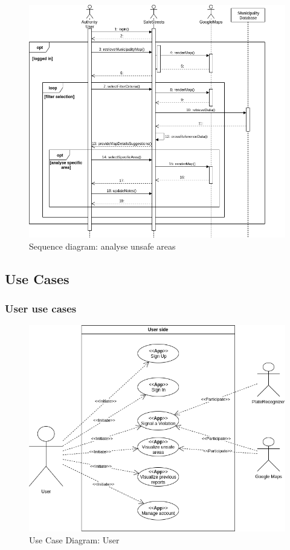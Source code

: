 \documentclass{article}
\begin{document}
\begin{figure}[H]
    \centering
    \includegraphics[scale=0.47]{Images/SequenceThirdPartyUnsafeAreas} 
    \caption{Sequence diagram: analyse unsafe areas}
\end{figure}


\subsection{Use Cases}
\subsubsection{User use cases}
\begin{figure}[H]
    \centering
    \includegraphics[scale=0.5]{Images/UseCaseUserView}
    \caption{Use Case Diagram: User}
\end{figure}
\end{document}
